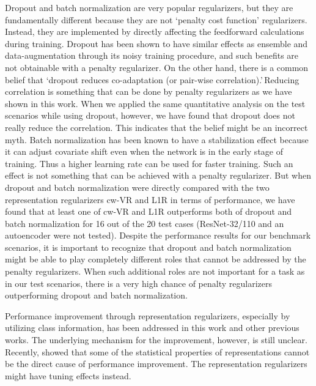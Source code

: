 Dropout and batch normalization are very popular regularizers, but they are fundamentally different because they are not \lq penalty cost function' regularizers. Instead, they are implemented by directly affecting the feedforward calculations during training. Dropout has been shown to have similar effects as ensemble and data-augmentation through its noisy training procedure, and such benefits are not obtainable with a penalty regularizer. On the other hand, there is a common belief that \lq dropout reduces co-adaptation (or pair-wise correlation).\rq \,Reducing correlation is something that can be done by penalty regularizers as we have shown in this work. When we applied the same quantitative analysis on the test scenarios while using dropout, however, we have found that dropout does not really reduce the correlation. This indicates that the belief might be an incorrect myth. 
Batch normalization has been known to have a stabilization effect because it can adjust covariate shift even when the network is in the early stage of training. Thus a higher learning rate can be used for faster training. Such an effect is not something that can be achieved with a penalty regularizer. But when dropout and batch normalization were directly compared with the two representation regularizers cw-VR and L1R in terms of performance, we have found that at least one of cw-VR and L1R outperforms both of dropout and batch normalization for 16 out of the 20 test cases (ResNet-32/110 and an autoencoder were not tested).
Despite the performance results for our benchmark scenarios, it is important to recognize that dropout and batch normalization might be able to play completely different roles that cannot be addressed by the penalty regularizers. When such additional roles are not important for a task as in our test scenarios, there is a very high chance of penalty regularizers outperforming dropout and batch normalization.

Performance improvement through representation regularizers, especially by utilizing class information, has been addressed in this work and other previous works. The underlying mechanism for the improvement, however, is still unclear. Recently, \cite{choi2018statistical} showed that
some of the statistical properties of representations cannot be the direct cause of performance improvement. The representation regularizers might have tuning effects instead. 

